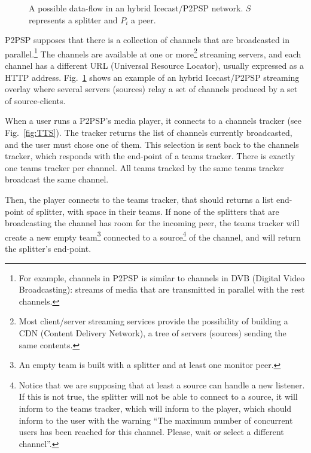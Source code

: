 \label{sec:TTS}

\begin{figure}
   \caption{A possible data-flow in an
  hybrid Icecast/P2PSP network. $S$ represents a splitter and $P_i$ a
  peer.\label{fig:icecast-P2PSP}}
\end{figure}

P2PSP supposes that there is a collection of channels that are
broadcasted in parallel.\footnote{For example, channels in P2PSP is
  similar to channels in DVB (Digital Video Broadcasting): streams of
  media that are transmitted in parallel with the rest channels.} The
channels are available at one or more\footnote{Most client/server
  streaming services provide the possibility of building a CDN
  (Content Delivery Network), a tree of servers (sources) sending the
  same contents.} streaming servers, and each channel has a different
URL (Universal Resource Locator), usually expressed as a HTTP
address. Fig.~\ref{fig:icecast-P2PSP} shows an example of an hybrid
Icecast/P2PSP streaming overlay where several servers (sources) relay
a set of channels produced by a set of source-clients.

\begin{figure*}
   \caption{Procedures to determine a suitable team
    given a channel. By definition, tasks (infinite loops) and threads
    (finite loops) are run in parallel with other tasks and
    threads.\label{fig:TTS}}
\end{figure*}

When a user runs a P2PSP's media player, it connects to a channels
tracker (see Fig.~\ref{fig:TTS}). The tracker returns the list of
channels currently broadcasted, and the user must chose one of
them. This selection is sent back to the channels tracker, which
responds with the end-point of a teams tracker. There is exactly one
teams tracker per channel. All teams tracked by the same teams tracker
broadcast the same channel.

Then, the player connects to the teams tracker, that should returns a
list end-point of splitter, with space in their teams. If none of the
splitters that are broadcasting the channel has room for the incoming
peer, the teams tracker will create a new empty team\footnote{An empty
  team is built with a splitter and at least one monitor peer.}
connected to a source\footnote{Notice that we are supposing that at
  least a source can handle a new listener. If this is not true, the
  splitter will not be able to connect to a source, it will inform to
  the teams tracker, which will inform to the player, which should
  inform to the user with the warning ``The maximum number of
  concurrent users has been reached for this channel. Please, wait or
  select a different channel''.} of the channel, and will return the
splitter's end-point.

